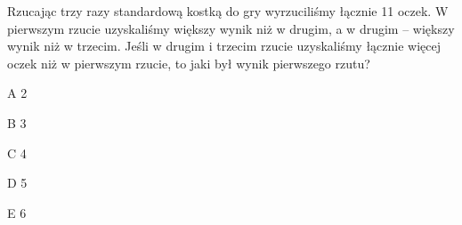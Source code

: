 \begin{tresc}
Rzucając trzy razy standardową kostką do gry wyrzuciliśmy łącznie 11 oczek. W pierwszym rzucie uzyskaliśmy większy wynik niż w drugim, a w drugim – większy wynik niż w trzecim. Jeśli w drugim i trzecim rzucie uzyskaliśmy łącznie więcej oczek niż w pierwszym rzucie, to jaki był wynik pierwszego rzutu?
\end{tresc}
\begin{wariant}{A} 2 \end{wariant}
\begin{wariant}{B} 3 \end{wariant}
\begin{wariant}{C} 4 \end{wariant}
\begin{wariant}{D} 5 \end{wariant}
\begin{wariant}{E} 6 \end{wariant}
